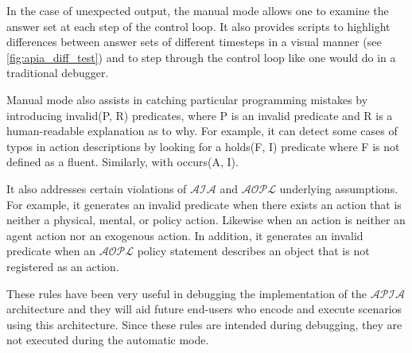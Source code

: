 In the case of unexpected output, the manual mode allows one to examine the answer set at each step of the control loop.
It also provides scripts to highlight differences between answer sets of different timesteps in a visual manner (see \cref{fig:apia_diff_test}) and to step through the control loop like one would do in a traditional debugger.

Manual mode also assists in catching particular programming mistakes by introducing invalid(P, R) predicates, where P is an invalid predicate and R is a human-readable explanation as to why.
For example, it can detect some cases of typos in action descriptions by looking for a holds(F, I) predicate where F is not defined as a fluent.
Similarly, with occurs(A, I).

It also addresses certain violations of $\mathcal{AIA}$ and $\mathcal{AOPL}$ underlying assumptions.
For example, it generates an invalid predicate when there exists an action that is neither a physical, mental, or policy action.
Likewise when an action is neither an agent action nor an exogenous action.
In addition, it generates an invalid predicate when an $\mathcal{AOPL}$ policy statement describes an object that is not registered as an action.

These rules have been very useful in debugging the implementation of the $\mathcal{APIA}$ architecture and they will aid future end-users who encode and execute scenarios using this architecture.
Since these rules are intended during debugging, they are not executed during the automatic mode.
